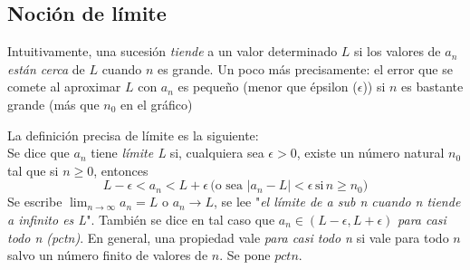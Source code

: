 \documentclass[../Teoría.root.tex]{subfiles}
\begin{document}
    \subsection{Noción de límite}
    Intuitivamente, una sucesión \textit{tiende} a un valor determinado \(L\) si los valores de \(a_n\) \textit{están cerca} de \(L\) cuando \(n\) es grande. Un poco más precisamente: el error que se comete al aproximar \(L\) con \(a_n\) es pequeño (menor que épsilon (\(\epsilon\))) si \(n\) es bastante grande (más que \(n_0\) en el gráfico)
    \begin{center}
        \begin{scaletikzpicturetowidth}{\linewidth}
        \end{scaletikzpicturetowidth}
    \end{center}
    La definición precisa de límite es la siguiente:\\
    Se dice que \(a_n\) tiene \textit{límite L} si, cualquiera sea \(\epsilon>0\), existe un número natural \(n_0\) tal que si \(n\geq0\), entonces \[L-\epsilon<a_n<L+\epsilon\,\text{(o sea \(|a_n-L|<\epsilon\,\text{si}\,n\geq n_0\))}\]
    Se escribe \(\lim_{n\to\infty}a_n=L\) o \(a_n\rightarrow L\), se lee "\textit{el límite de a sub n cuando n tiende a infinito es L}".
    También se dice en tal caso que \(a_n\in(L-\epsilon,L+\epsilon)\) \textit{para casi todo n (pctn)}. En general, una propiedad vale \textit{para casi todo n} si vale para todo \(n\) salvo un número finito de valores de \(n\). Se pone \(pctn\).
\end{document}

